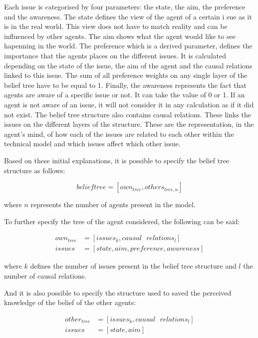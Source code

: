 Each issue is categorised by four parameters: the state, the aim, the preference and the awareness. The state defines the view of the agent of a certain i
sue as it is in the real world. This view does not have to match reality and can be influenced by other agents. The aim shows what the agent would like to see hapenning in the world. The preference  which is a derived parameter, defines the importance that the agents places on the different issues. It is calculated depending on the state of the issue, the aim of the agent and the causal relations linked to this issue. The sum of all preference weights on any single layer of the belief tree have to be equal to 1. Finally, the awareness represents the fact that agents are aware of a specific issue or not. It can take the value of 0 or 1. If an agent is not aware of an issue, it will not consider it in any calculation as if it did not exist. The belief tree structure also contains causal relations. These links the issues on the different layers of the structure. These are the representation, in the agent's mind, of how each of the issues are related to each other within the technical model and which issues affect which other issue.

Based on these initial explanations, it is possible to specify the belief tree structure as follows:

\begin{equation}
belieftree = [own_{tree}, others_{tree, n}]
\end{equation}

where $n$ represents the number of agents present in the model.

To further specify the tree of the agent considered, the following can be said:

\begin{equation}\begin{split}
own_{tree} &= [issues_k, causal\text{ }relations_l]\\
issues &= [state, aim, preference, awareness]
\end{split}\end{equation}

where $k$ defines the number of issues present in the belief tree structure and $l$ the number of causal relations.

And it is also possible to specify the structure used to saved the perceived knowledge of the belief of the other agents:

\begin{equation}\begin{split}
other_{tree} &= [issues_k, causal\text{ }relations_l]\\
issues &= [state, aim]
\end{split}\end{equation}

